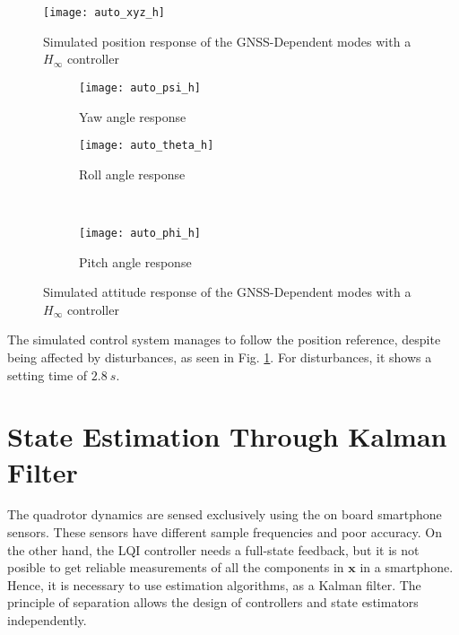 \begin{figure}[h]
	\begin{center}
	\texttt{[image: auto\_xyz\_h]}
	\caption{Simulated position response of the GNSS-Dependent modes with a $H_\infty$ controller}
	\label{fig:auto_xyz_h}
	\end{center}
	\end{figure}
\begin{figure}[H]
\begin{subfigure}{.5\linewidth}
\centering
\texttt{[image: auto\_psi\_h]}
\caption{Yaw angle response}
\label{fig:auto_psi_h}
\end{subfigure}%
\begin{subfigure}{.5\linewidth}
\centering
\texttt{[image: auto\_theta\_h]}
\caption{Roll angle response}
\label{fig:auto_theta_h}
\end{subfigure}\\[1ex]
\begin{subfigure}{\linewidth}
\centering
\texttt{[image: auto\_phi\_h]}
\caption{Pitch angle response}
\label{fig:auto_psi_h}
\end{subfigure}
\caption{Simulated attitude response of the GNSS-Dependent modes with a $H_\infty$ controller}
\label{fig:auto_h}
\end{figure}
The simulated control system manages to follow the position reference, despite being affected by disturbances, as seen in Fig. \ref{fig:auto_xyz_h}. For disturbances, it shows a setting time of $2.8\ s$.

\section{State Estimation Through Kalman Filter}
\label{sec:stateestimation}
The quadrotor dynamics are sensed exclusively using the on board smartphone sensors. These sensors have different sample frequencies and poor accuracy. On the other hand, the LQI controller needs a full-state feedback, but it is not posible to get reliable measurements of all the components in $\mathbf{x}$ in a smartphone. Hence, it is necessary to use estimation algorithms, as a Kalman filter. The principle of separation allows the design of controllers and state estimators independently.

